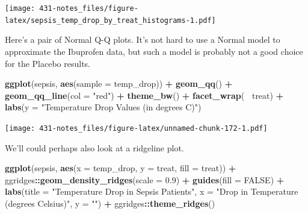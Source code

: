 \documentclass[
]{book}
\newenvironment{Shaded}{\begin{snugshade}}{\end{snugshade}}
\newcommand{\DataTypeTok}[1]{\textcolor[rgb]{0.13,0.29,0.53}{#1}}
\newcommand{\FloatTok}[1]{\textcolor[rgb]{0.00,0.00,0.81}{#1}}
\newcommand{\KeywordTok}[1]{\textcolor[rgb]{0.13,0.29,0.53}{\textbf{#1}}}
\newcommand{\NormalTok}[1]{#1}
\newcommand{\OperatorTok}[1]{\textcolor[rgb]{0.81,0.36,0.00}{\textbf{#1}}}
\newcommand{\OtherTok}[1]{\textcolor[rgb]{0.56,0.35,0.01}{#1}}
\newcommand{\StringTok}[1]{\textcolor[rgb]{0.31,0.60,0.02}{#1}}
\begin{document}
\texttt{[image: 431-notes\_files/figure-latex/sepsis\_temp\_drop\_by\_treat\_histograms-1.pdf]}

Here's a pair of Normal Q-Q plots. It's not hard to use a Normal model to approximate the Ibuprofen data, but such a model is probably not a good choice for the Placebo results.

\begin{Shaded}
\begin{Highlighting}[]
\KeywordTok{ggplot}\NormalTok{(sepsis, }\KeywordTok{aes}\NormalTok{(}\DataTypeTok{sample =}\NormalTok{ temp_drop)) }\OperatorTok{+}
\StringTok{    }\KeywordTok{geom_qq}\NormalTok{() }\OperatorTok{+}\StringTok{ }\KeywordTok{geom_qq_line}\NormalTok{(}\DataTypeTok{col =} \StringTok{"red"}\NormalTok{) }\OperatorTok{+}
\StringTok{    }\KeywordTok{theme_bw}\NormalTok{() }\OperatorTok{+}
\StringTok{    }\KeywordTok{facet_wrap}\NormalTok{(}\OperatorTok{~}\StringTok{ }\NormalTok{treat) }\OperatorTok{+}\StringTok{ }
\StringTok{    }\KeywordTok{labs}\NormalTok{(}\DataTypeTok{y =} \StringTok{"Temperature Drop Values (in degrees C)"}\NormalTok{)}
\end{Highlighting}
\end{Shaded}

\texttt{[image: 431-notes\_files/figure-latex/unnamed-chunk-172-1.pdf]}

We'll could perhaps also look at a ridgeline plot.

\begin{Shaded}
\begin{Highlighting}[]
\KeywordTok{ggplot}\NormalTok{(sepsis, }\KeywordTok{aes}\NormalTok{(}\DataTypeTok{x =}\NormalTok{ temp_drop, }\DataTypeTok{y =}\NormalTok{ treat, }\DataTypeTok{fill =}\NormalTok{ treat)) }\OperatorTok{+}
\StringTok{    }\NormalTok{ggridges}\OperatorTok{::}\KeywordTok{geom_density_ridges}\NormalTok{(}\DataTypeTok{scale =} \FloatTok{0.9}\NormalTok{) }\OperatorTok{+}
\StringTok{    }\KeywordTok{guides}\NormalTok{(}\DataTypeTok{fill =} \OtherTok{FALSE}\NormalTok{) }\OperatorTok{+}\StringTok{ }
\StringTok{    }\KeywordTok{labs}\NormalTok{(}\DataTypeTok{title =} \StringTok{"Temperature Drop in Sepsis Patients"}\NormalTok{,}
         \DataTypeTok{x =} \StringTok{"Drop in Temperature (degrees Celsius)"}\NormalTok{, }\DataTypeTok{y =} \StringTok{""}\NormalTok{) }\OperatorTok{+}
\StringTok{    }\NormalTok{ggridges}\OperatorTok{::}\KeywordTok{theme_ridges}\NormalTok{()}
\end{Highlighting}
\end{Shaded}
\end{document}

